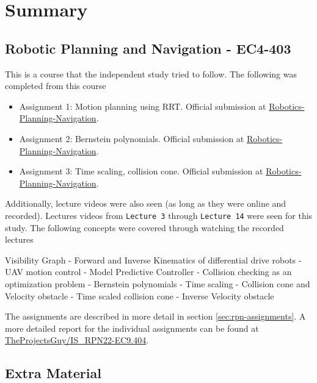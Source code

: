 \section{Summary}

\subsection{Robotic Planning and Navigation - EC4-403}
This is a course that the independent study tried to follow. The following was completed from this course

\begin{itemize}
    \item Assignment 1: Motion planning using RRT. Official submission at \href{https://github.com/Robotics-Planning-Navigation/assignment1-over-9000/tree/dev-avneesh}{Robotics-Planning-Navigation}.
    \item Assignment 2: Bernstein polynomials. Official submission at \href{https://github.com/Robotics-Planning-Navigation/assignment-two-TheProjectsGuy}{Robotics-Planning-Navigation}.
    \item Assignment 3: Time scaling, collision cone. Official submission at \href{https://github.com/Robotics-Planning-Navigation/assignment-2b-over-9000/tree/dev-avneesh}{Robotics-Planning-Navigation}.
\end{itemize}

Additionally, lecture videos were also seen (as long as they were online and recorded). Lectures videos from \texttt{Lecture 3} through \texttt{Lecture 14} were seen for this study. The following concepts were covered through watching the recorded lectures

\begin{displayquote}
    Visibility Graph - Forward and Inverse Kinematics of differential drive robots - UAV motion control - Model Predictive Controller - Collision checking as an optimization problem - Bernstein polynomials - Time scaling - Collision cone and Velocity obstacle - Time scaled collision cone - Inverse Velocity obstacle
\end{displayquote}

The assignments are described in more detail in section \ref{sec:rpn-assignments}. A more detailed report for the individual assignments can be found at \href{https://github.com/TheProjectsGuy/IS_RPN22-EC9.404}{TheProjectsGuy/IS\_RPN22-EC9.404}.

\subsection{Extra Material}


